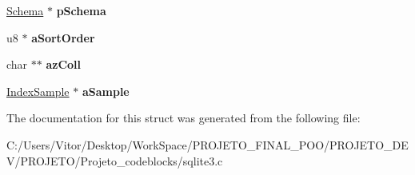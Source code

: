 \begin{DoxyCompactItemize}
\item 
\hypertarget{struct_index_af14f5ddd57eab2aba63dcb5db2aa92af}{\hyperlink{struct_schema}{Schema} $\ast$ {\bfseries p\-Schema}}\label{struct_index_af14f5ddd57eab2aba63dcb5db2aa92af}

\item 
\hypertarget{struct_index_a0a3fc87b53193995f59c9657443e9a99}{u8 $\ast$ {\bfseries a\-Sort\-Order}}\label{struct_index_a0a3fc87b53193995f59c9657443e9a99}

\item 
\hypertarget{struct_index_ab690ebb96c0329896b0fe2ab56813b88}{char $\ast$$\ast$ {\bfseries az\-Coll}}\label{struct_index_ab690ebb96c0329896b0fe2ab56813b88}

\item 
\hypertarget{struct_index_afa441de8beb041e894ce10665657c7cd}{\hyperlink{struct_index_sample}{Index\-Sample} $\ast$ {\bfseries a\-Sample}}\label{struct_index_afa441de8beb041e894ce10665657c7cd}

\end{DoxyCompactItemize}


The documentation for this struct was generated from the following file\-:\begin{DoxyCompactItemize}
\item 
C\-:/\-Users/\-Vitor/\-Desktop/\-Work\-Space/\-P\-R\-O\-J\-E\-T\-O\-\_\-\-F\-I\-N\-A\-L\-\_\-\-P\-O\-O/\-P\-R\-O\-J\-E\-T\-O\-\_\-\-D\-E\-V/\-P\-R\-O\-J\-E\-T\-O/\-Projeto\-\_\-codeblocks/sqlite3.\-c\end{DoxyCompactItemize}
